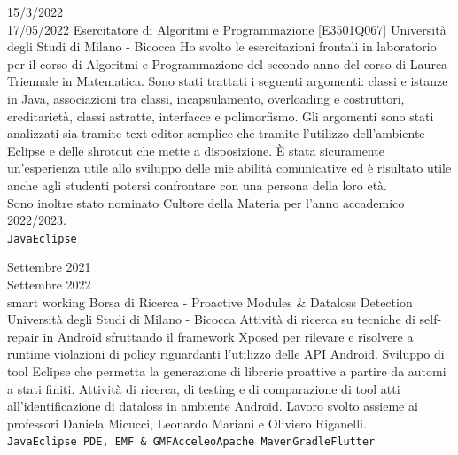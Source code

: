 \documentclass[9pt]{developercv} %
\begin{document}
\begin{entrylist}

\entry
	{15/3/2022 \\ 17/05/2022}
	{Esercitatore di Algoritmi e Programmazione [E3501Q067]}
	{Università degli Studi di Milano - Bicocca}
	{Ho svolto le esercitazioni frontali in laboratorio per il corso di Algoritmi e Programmazione del secondo anno del corso di Laurea Triennale in Matematica. Sono stati trattati i seguenti argomenti: classi e istanze in Java, associazioni tra classi, incapsulamento, overloading e costruttori, ereditarietà, classi astratte, interfacce e polimorfismo. Gli argomenti sono stati analizzati sia tramite text editor semplice che tramite l'utilizzo dell'ambiente Eclipse e delle shrotcut che mette a disposizione. È stata sicuramente un'esperienza utile allo sviluppo delle mie abilità comunicative ed è risultato utile anche agli studenti potersi confrontare con una persona della loro età.\\
Sono inoltre stato nominato Cultore della Materia per l'anno accademico 2022/2023.\\ \texttt{Java}\slashsep\texttt{Eclipse}}

\entry
	{Settembre 2021 \\ Settembre 2022	\\\footnotesize{smart working}}
	{Borsa di Ricerca - Proactive Modules \& Dataloss Detection}
	{Università degli Studi di Milano - Bicocca}
	{Attività di ricerca su tecniche di self-repair in Android sfruttando il framework Xposed per rilevare e risolvere a runtime violazioni di policy riguardanti l'utilizzo delle API Android. Sviluppo di tool Eclipse che permetta la generazione di librerie proattive a partire da automi a stati finiti. Attività di ricerca, di testing e di comparazione di tool atti all'identificazione di dataloss in ambiente Android. Lavoro svolto assieme ai professori Daniela Micucci, Leonardo Mariani e Oliviero Riganelli. \\ \texttt{Java}\slashsep\texttt{Eclipse PDE, EMF \& GMF}\slashsep\texttt{Acceleo}\slashsep\texttt{Apache Maven}\slashsep\texttt{Gradle}\slashsep\texttt{Flutter}}
	

\end{entrylist}
\end{document}
